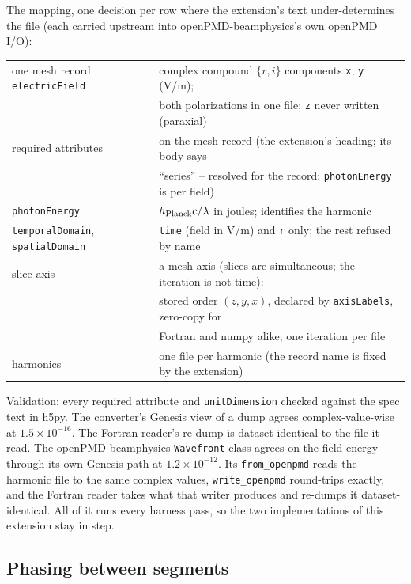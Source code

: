 \documentclass[11pt]{article}
\newcommand{\code}[1]{\texttt{#1}}
\begin{document}
The mapping, one decision per row where the extension's text under-determines the
file (each carried upstream into openPMD-beamphysics's own openPMD I/O):

\begin{center}
\begin{tabular}{ll}
one mesh record \code{electricField} & complex compound $\{r,i\}$ components
\code{x}, \code{y} (V/m); \\
& both polarizations in one file; \code{z} never written (paraxial) \\
required attributes & on the mesh record (the extension's heading; its body says \\
& ``series'' -- resolved for the record: \code{photonEnergy} is per field) \\
\code{photonEnergy} & $h_{\rm Planck} c/\lambda$ in joules; identifies the harmonic \\
\code{temporalDomain}, \code{spatialDomain} & \code{time} (field in
V/m) and \code{r} only; the rest refused by name \\
slice axis & a mesh axis (slices are simultaneous; the iteration is not time): \\
& stored order $(z,y,x)$, declared by \code{axisLabels}, zero-copy for \\
& Fortran and numpy alike; one iteration per file \\
harmonics & one file per harmonic (the record name is fixed by the extension) \\
\end{tabular}
\end{center}

Validation: every required attribute and \code{unitDimension} checked against the
spec text in h5py. The converter's Genesis view of a dump agrees complex-value-wise at
$1.5\times10^{-16}$. The Fortran reader's re-dump is dataset-identical to the file it
read. The openPMD-beamphysics \code{Wavefront} class
agrees on the field energy through its own Genesis path at $1.2\times10^{-12}$.
Its \code{from\_openpmd} reads the harmonic file to the same complex values,
\code{write\_openpmd} round-trips exactly, and the Fortran reader takes what that
writer produces and re-dumps it dataset-identical. All of it runs every harness
pass, so the two implementations of this extension stay in step.

\subsection{Phasing between segments}\label{sec:phasing}
\end{document}
